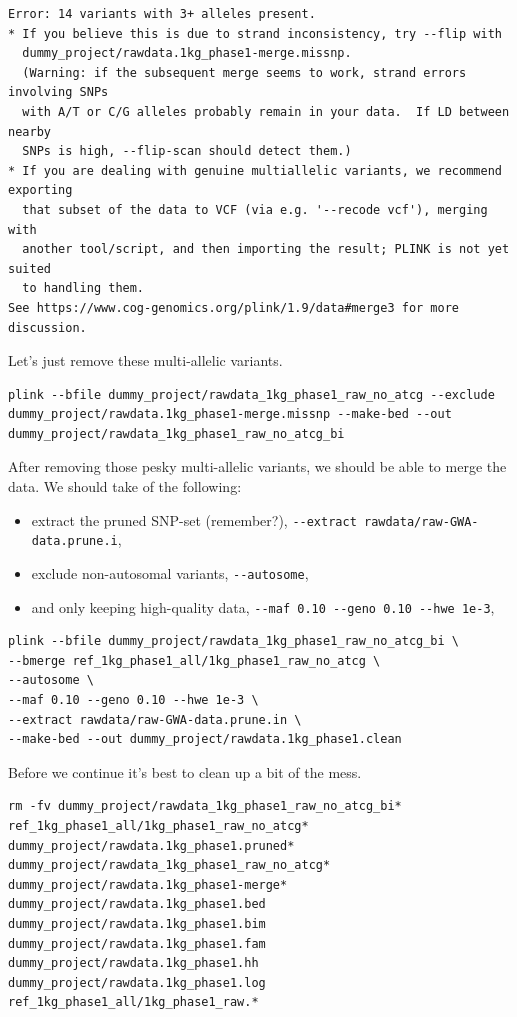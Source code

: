\documentclass[
]{book}
\newcommand{\passthrough}[1]{#1}
\providecommand{\tightlist}{%
  \setlength{\itemsep}{0pt}\setlength{\parskip}{0pt}}
\begin{document}
\begin{lstlisting}
Error: 14 variants with 3+ alleles present.
* If you believe this is due to strand inconsistency, try --flip with
  dummy_project/rawdata.1kg_phase1-merge.missnp.
  (Warning: if the subsequent merge seems to work, strand errors involving SNPs
  with A/T or C/G alleles probably remain in your data.  If LD between nearby
  SNPs is high, --flip-scan should detect them.)
* If you are dealing with genuine multiallelic variants, we recommend exporting
  that subset of the data to VCF (via e.g. '--recode vcf'), merging with
  another tool/script, and then importing the result; PLINK is not yet suited
  to handling them.
See https://www.cog-genomics.org/plink/1.9/data#merge3 for more discussion.
\end{lstlisting}

Let's just remove these multi-allelic variants.

\begin{lstlisting}
plink --bfile dummy_project/rawdata_1kg_phase1_raw_no_atcg --exclude dummy_project/rawdata.1kg_phase1-merge.missnp --make-bed --out dummy_project/rawdata_1kg_phase1_raw_no_atcg_bi
\end{lstlisting}

After removing those pesky multi-allelic variants, we should be able to merge the data. We should take of the following:

\begin{itemize}
\tightlist
\item
  extract the pruned SNP-set (remember?), \passthrough{\lstinline!--extract rawdata/raw-GWA-data.prune.i!},
\item
  exclude non-autosomal variants, \passthrough{\lstinline!--autosome!},
\item
  and only keeping high-quality data, \passthrough{\lstinline!--maf 0.10 --geno 0.10 --hwe 1e-3!},
\end{itemize}

\begin{lstlisting}
plink --bfile dummy_project/rawdata_1kg_phase1_raw_no_atcg_bi \
--bmerge ref_1kg_phase1_all/1kg_phase1_raw_no_atcg \
--autosome \
--maf 0.10 --geno 0.10 --hwe 1e-3 \
--extract rawdata/raw-GWA-data.prune.in \
--make-bed --out dummy_project/rawdata.1kg_phase1.clean
\end{lstlisting}

Before we continue it's best to clean up a bit of the mess.

\begin{lstlisting}
rm -fv dummy_project/rawdata_1kg_phase1_raw_no_atcg_bi* ref_1kg_phase1_all/1kg_phase1_raw_no_atcg* dummy_project/rawdata.1kg_phase1.pruned* dummy_project/rawdata_1kg_phase1_raw_no_atcg* dummy_project/rawdata.1kg_phase1-merge* dummy_project/rawdata.1kg_phase1.bed dummy_project/rawdata.1kg_phase1.bim dummy_project/rawdata.1kg_phase1.fam dummy_project/rawdata.1kg_phase1.hh dummy_project/rawdata.1kg_phase1.log ref_1kg_phase1_all/1kg_phase1_raw.*
\end{lstlisting}
\end{document}
